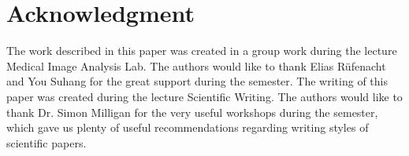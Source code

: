 \documentclass[journal]{IEEEtran}
\begin{document}
\section*{Acknowledgment}

The work described in this paper was created in a group work during the lecture Medical Image Analysis Lab. The authors would like to thank Elias R\"ufenacht and You Suhang for the great support during the semester. The writing of this paper was created during the lecture Scientific Writing. The authors would like to thank Dr. Simon Milligan for the very useful workshops during the semester, which gave us plenty of useful recommendations regarding writing styles of scientific papers.



\ifCLASSOPTIONcaptionsoff
  \newpage
\fi







%






% 

\end{document}
